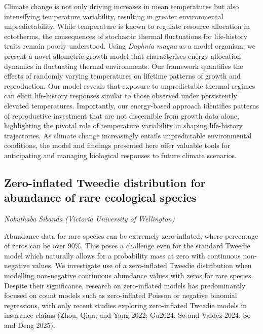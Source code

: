 \documentclass[
]{scrreprt}
\begin{document}
Climate change is not only driving increases in mean temperatures but
also intensifying temperature variability, resulting in greater
environmental unpredictability. While temperature is known to regulate
resource allocation in ectotherms, the consequences of stochastic
thermal fluctuations for life-history traits remain poorly understood.
Using \emph{Daphnia magna} as a model organism, we present a novel
allometric growth model that characterises energy allocation dynamics in
fluctuating thermal environments. Our framework quantifies the effects
of randomly varying temperatures on lifetime patterns of growth and
reproduction. Our model reveals that exposure to unpredictable thermal
regimes can elicit life-history responses similar to those observed
under persistently elevated temperatures. Importantly, our energy-based
approach identifies patterns of reproductive investment that are not
discernible from growth data alone, highlighting the pivotal role of
temperature variability in shaping life-history trajectories. As climate
change increasingly entails unpredictable environmental conditions, the
model and findings presented here offer valuable tools for anticipating
and managing biological responses to future climate scenarios.

\subsection{Zero-inflated Tweedie distribution for abundance of rare
ecological
species}\label{zero-inflated-tweedie-distribution-for-abundance-of-rare-ecological-species}

\emph{Nokuthaba Sibanda} \emph{(Victoria
University of Wellington)}

\setlength{\parskip}{0.5em}

Abundance data for rare species can be extremely zero-inflated, where
percentage of zeros can be over 90\%. This poses a challenge even for
the standard Tweedie model which naturally allows for a probability mass
at zero with continuous non-negative values. We investigate use of a
zero-inflated Tweedie distribution when modelling non-negative
continuous abundance values with zeros for rare species. Despite their
significance, research on zero-inflated models has predominantly focused
on count models such as zero-inflated Poisson or negative binomial
regressions, with only recent studies exploring zero-inflated Tweedie
models in insurance claims (Zhou, Qian, and Yang 2022; Gu2024; So and
Valdez 2024; So and Deng 2025).
\end{document}
